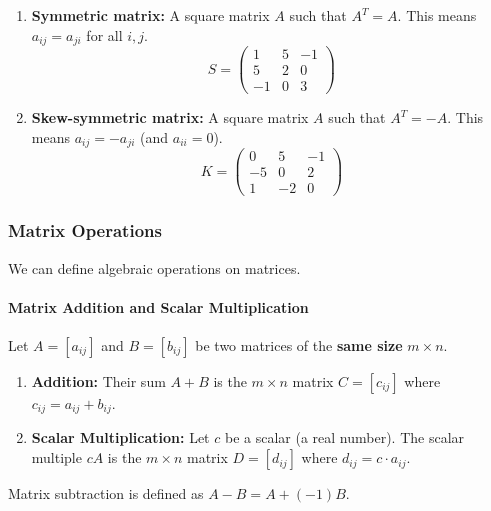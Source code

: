 \begin{enumerate}
    \item \textbf{Symmetric matrix:} A square matrix $A$ such that $A^T = A$. This means $a_{ij} = a_{ji}$ for all $i, j$.
    \[ S = \begin{pmatrix} 1 & 5 & -1 \\ 5 & 2 & 0 \\ -1 & 0 & 3 \end{pmatrix} \]
    \item \textbf{Skew-symmetric matrix:} A square matrix $A$ such that $A^T = -A$. This means $a_{ij} = -a_{ji}$ (and $a_{ii} = 0$).
    \[ K = \begin{pmatrix} 0 & 5 & -1 \\ -5 & 0 & 2 \\ 1 & -2 & 0 \end{pmatrix} \]
\end{enumerate}

\subsubsection{Matrix Operations}

We can define algebraic operations on matrices.

\paragraph{Matrix Addition and Scalar Multiplication}
\begin{definition}
Let $A = [a_{ij}]$ and $B = [b_{ij}]$ be two matrices of the \textbf{same size} $m \times n$.
\begin{enumerate}
    \item \textbf{Addition:} Their sum $A+B$ is the $m \times n$ matrix $C = [c_{ij}]$ where $c_{ij} = a_{ij} + b_{ij}$.
    \item \textbf{Scalar Multiplication:} Let $c$ be a scalar (a real number). The scalar multiple $cA$ is the $m \times n$ matrix $D = [d_{ij}]$ where $d_{ij} = c \cdot a_{ij}$.
\end{enumerate}
Matrix subtraction is defined as $A - B = A + (-1)B$.
\end{definition}

